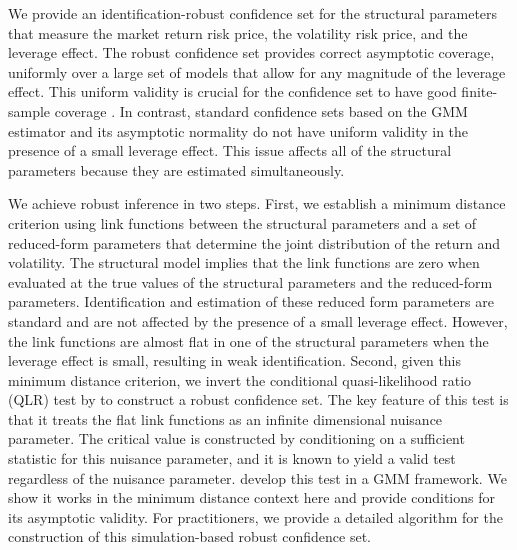 We provide an identification-robust confidence set for the structural parameters that measure the market return risk price, the volatility risk price, and the leverage effect. 
The robust confidence set provides correct asymptotic coverage, uniformly over a large set of models that allow for any magnitude of the leverage effect. This uniform validity is crucial for the confidence set to have good finite-sample coverage \parencites{mikusheva2007uniform, andrews2010asymptotic}. In contrast, standard confidence sets based on the GMM estimator and its asymptotic normality do not have uniform validity in the presence of a small leverage effect. This issue affects all of the structural parameters because they are estimated simultaneously.

We achieve robust inference in two steps. First, we establish a minimum distance criterion using link functions between the structural parameters and a set of reduced-form parameters that determine the joint distribution of the return and volatility. The structural model implies that the link functions are zero when evaluated at the true values of the structural parameters and the reduced-form parameters. Identification and estimation of these reduced form parameters are standard and are not affected by the presence of a small leverage effect. However, the link functions are almost flat in one of the structural parameters when the leverage effect is small, resulting in weak identification. Second, given this minimum distance criterion, we invert the conditional quasi-likelihood ratio (QLR) test by \textcite{andrews2016conditional} to construct a robust confidence set. The key feature of this test is that it treats the flat link functions as an infinite dimensional nuisance parameter. The critical value is constructed by conditioning on a sufficient statistic for this nuisance parameter, and it is known to yield a valid test regardless of the nuisance parameter. \Textcite{andrews2016conditional} develop this test in a GMM framework. We show it works in the minimum distance context here and provide conditions for its asymptotic validity. For practitioners, we provide a detailed algorithm for the construction of this simulation-based robust confidence set.


